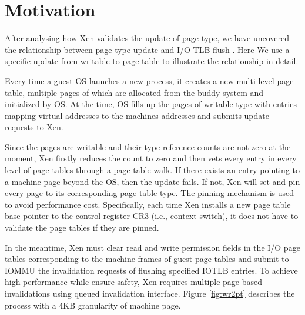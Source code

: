 \section{Motivation}



After analysing how Xen validates the update of page type, we have uncovered the relationship between page type update and I/O TLB flush . Here We use a specific update from writable to page-table to illustrate the relationship in detail.

Every time a guest OS launches a new process, it creates a new multi-level page table, multiple pages of which are allocated from the buddy system and initialized by OS. At the time, OS fills up the pages of writable-type with entries mapping virtual addresses to the machines addresses and submits update requests to Xen.

Since the pages are writable and their type reference counts are not zero at the moment, Xen firstly reduces the count to zero and then vets every entry in every level of page tables through a page table walk. If there exists an entry pointing to a machine page beyond the OS, then the update fails. If not, Xen will set and pin every page to its corresponding page-table type. The pinning mechanism is used to avoid performance cost. Specifically, each time Xen installs a new page table base pointer to the control register CR3 (i.e., context switch), it does not have to validate the page tables if they are pinned.

In the meantime, Xen must clear read and write permission fields in the I/O page tables corresponding to the machine frames of guest page tables and submit to IOMMU the invalidation requests of flushing specified IOTLB entries. To achieve high performance while ensure safety, Xen requires multiple page-based invalidations using queued invalidation interface. Figure \ref{fig:wr2pt} describes the process with a 4KB granularity of machine page.

